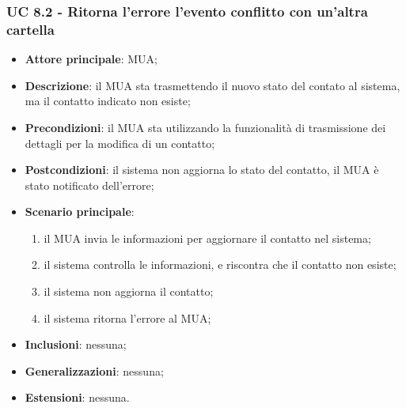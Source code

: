 \subsubsection{UC 8.2 - Ritorna l'errore l'evento conflitto con un'altra cartella} \label{sec:UC8.2}
    \begin{itemize}
        \item \textbf{Attore principale}: MUA;
        \item \textbf{Descrizione}: il MUA sta trasmettendo il nuovo stato del contato al sistema, ma il contatto indicato non esiste;
        \item \textbf{Precondizioni}: il MUA sta utilizzando la funzionalità di trasmissione dei dettagli per la modifica di un contatto;
        \item \textbf{Postcondizioni}: il sistema non aggiorna lo stato del contatto, il MUA è stato notificato dell'errore;
        \item \textbf{Scenario principale}:
            \begin{enumerate}
                \item il MUA invia le informazioni per aggiornare il contatto nel sistema;
                \item il sistema controlla le informazioni, e riscontra che il contatto non esiste;
                \item il sistema non aggiorna il contatto;
                \item il sistema ritorna l'errore al MUA;
            \end{enumerate}
        \item \textbf{Inclusioni}: nessuna;
        \item \textbf{Generalizzazioni}: nessuna;
        \item \textbf{Estensioni}: nessuna.
    \end{itemize}

